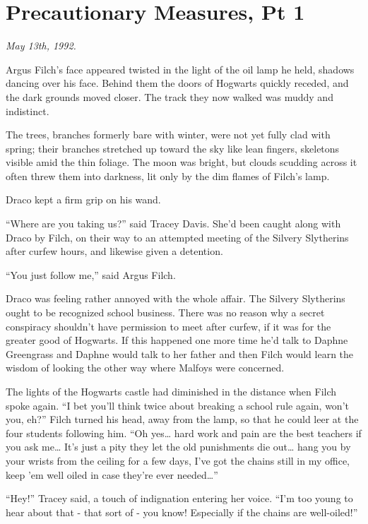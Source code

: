 \chapter{Precautionary Measures, Pt 1}

\emph{May 13th, 1992.}

Argus Filch's face appeared twisted in the light of the oil lamp he
held, shadows dancing over his face. Behind them the doors of Hogwarts
quickly receded, and the dark grounds moved closer. The track they now
walked was muddy and indistinct.

The trees, branches formerly bare with winter, were not yet fully clad
with spring; their branches stretched up toward the sky like lean
fingers, skeletons visible amid the thin foliage. The moon was bright,
but clouds scudding across it often threw them into darkness, lit only
by the dim flames of Filch's lamp.

Draco kept a firm grip on his wand.

``Where are you taking us?'' said Tracey Davis. She'd been caught along
with Draco by Filch, on their way to an attempted meeting of the Silvery
Slytherins after curfew hours, and likewise given a detention.

``You just follow me,'' said Argus Filch.

Draco was feeling rather annoyed with the whole affair. The Silvery
Slytherins ought to be recognized school business. There was no reason
why a secret conspiracy shouldn't have permission to meet after curfew,
if it was for the greater good of Hogwarts. If this happened one more
time he'd talk to Daphne Greengrass and Daphne would talk to her father
and then Filch would learn the wisdom of looking the other way where
Malfoys were concerned.

The lights of the Hogwarts castle had diminished in the distance when
Filch spoke again. ``I bet you'll think twice about breaking a school
rule again, won't you, eh?'' Filch turned his head, away from the lamp,
so that he could leer at the four students following him. ``Oh
yes\ldots{} hard work and pain are the best teachers if you ask
me\ldots{} It's just a pity they let the old punishments die out\ldots{}
hang you by your wrists from the ceiling for a few days, I've got the
chains still in my office, keep 'em well oiled in case they're ever
needed\ldots{}''

``Hey!'' Tracey said, a touch of indignation entering her voice. ``I'm
too young to hear about that - that sort of - you know! Especially if
the chains are well-oiled!''


